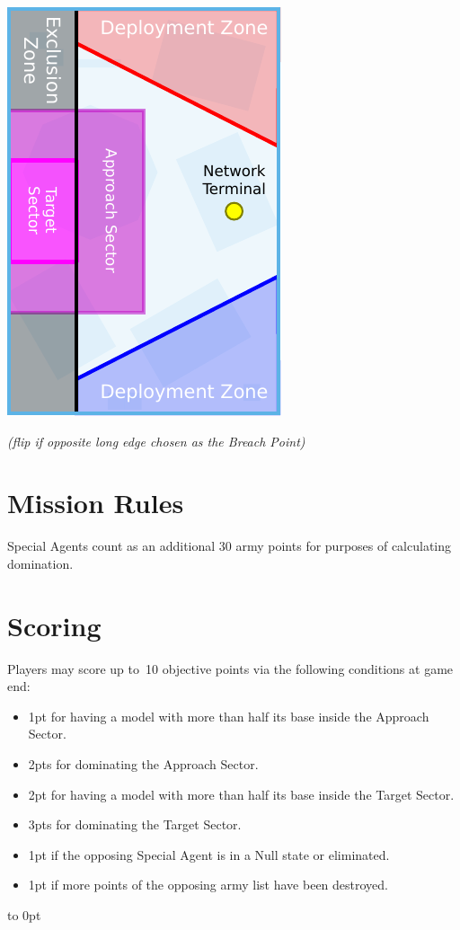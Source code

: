 \begin{minipage}[t]{2in}\centering
\vspace{4pt}   
\includegraphics{maps/map-breachpoint}

\medskip\small%
\emph{(flip if opposite long edge chosen as the Breach Point)}
\end{minipage}

\section{Mission Rules}

Special Agents count as an additional 30 army points for purposes of
calculating domination.

\section{Scoring}

Players may score up to~10 objective points via the following
conditions at game end:
\begin{itemize}\shortlist
\item 1pt for having a model with more than half its base inside the
  Approach Sector.
\item 2pts for dominating the Approach Sector.
\item 2pt for having a model with more than half its base inside the
  Target Sector.
\item 3pts for dominating the Target Sector.
\item 1pt if the opposing Special Agent is in a Null state or eliminated.
\item 1pt if more points of the opposing army list have been destroyed.
\end{itemize}

\vfill
\vbox to 0pt{}